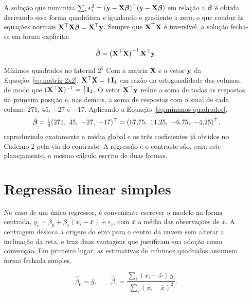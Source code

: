\documentclass{doeapostila}
\begin{document}
A solução que minimiza $\sum_i e_i^{2} = (\mathbf{y} - \mathbf{X}\boldsymbol{\beta})^{\top}
(\mathbf{y} - \mathbf{X}\boldsymbol{\beta})$ em relação a $\boldsymbol{\beta}$ é obtida derivando essa
forma quadrática e igualando o gradiente a zero, o que conduz às equações
normais $\mathbf{X}^{\top}\mathbf{X}\boldsymbol{\beta} = \mathbf{X}^{\top}\mathbf{y}$. Sempre que
$\mathbf{X}^{\top}\mathbf{X}$ é inversível, a solução fecha-se em forma explícita:

\begin{equation}
  \hat{\boldsymbol{\beta}} = \left( \mathbf{X}^{\top}\mathbf{X} \right)^{-1} \mathbf{X}^{\top}\mathbf{y} .
  \label{eq:minimos-quadrados}
\end{equation}

\begin{aplicacao}{Mínimos quadrados no fatorial $2^{2}$}
  Com a matriz $\mathbf{X}$ e o vetor $\mathbf{y}$ da Equação~\eqref{eq:matriz-2x2},
  $\mathbf{X}^{\top}\mathbf{X} = 4\,\mathbf{I}_4$ em razão da ortogonalidade das
  colunas, de modo que $(\mathbf{X}^{\top}\mathbf{X})^{-1} = \tfrac{1}{4}
  \mathbf{I}_4$. O vetor $\mathbf{X}^{\top}\mathbf{y}$ reúne a soma de todas as
  respostas na primeira posição e, nas demais, a soma de respostas com o
  sinal de cada coluna: $271$, $45$, $-27$ e $-17$. Aplicando a
  Equação~\eqref{eq:minimos-quadrados},
  \[
    \hat{\vetbeta} = \tfrac{1}{4}(271,\ 45,\ -27,\ -17)^{\top}
    = (67{,}75,\ 11{,}25,\ -6{,}75,\ -4{,}25)^{\top} ,
  \]
  reproduzindo exatamente a média global e os três coeficientes já obtidos
  no Caderno 2 pela via do contraste. A regressão e o contraste são, para
  este planejamento, o mesmo cálculo escrito de duas formas.
\end{aplicacao}

\section{Regressão linear simples}

No caso de um único regressor, é conveniente escrever o modelo na forma
centrada, $y_i = \beta_0 + \beta_1(x_i - \bar{x}) + \varepsilon_i$, com
$\bar{x}$ a média das observações de $x$. A centragem desloca a origem do
eixo para o centro da nuvem sem alterar a inclinação da reta, e traz duas
vantagens que justificam sua adoção como convenção. Em primeiro lugar, as
estimativas de mínimos quadrados assumem forma fechada simples,

\begin{equation}
  \hat{\beta}_0 = \bar{y} , \qquad
  \hat{\beta}_1 = \frac{\sum_i (x_i - \bar{x})\, y_i}
    {\sum_i (x_i - \bar{x})^{2}} .
  \label{eq:reg-simples}
\end{equation}
\end{document}

